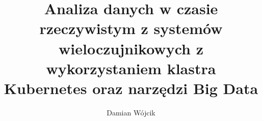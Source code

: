 
\title{Analiza danych w czasie rzeczywistym z systemów wieloczujnikowych z wykorzystaniem klastra Kubernetes oraz narzędzi Big Data}

\author{Damian Wójcik}

